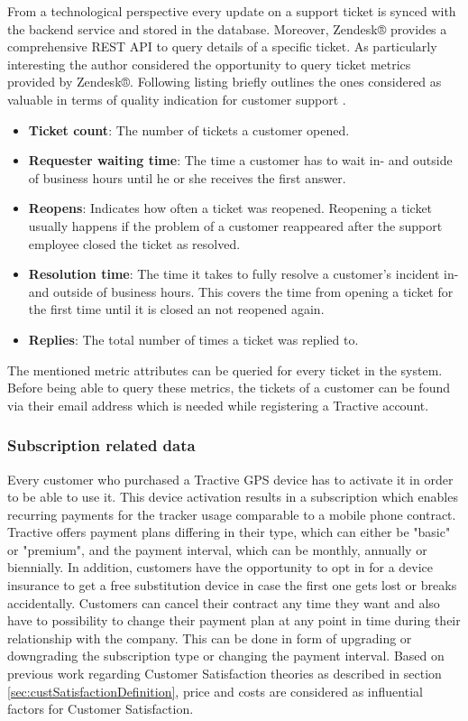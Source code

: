 From a technological perspective every update on a support ticket is synced with the backend service and stored in the database. Moreover, Zendesk® provides a comprehensive REST API to query details of a specific ticket. As particularly interesting the author considered the opportunity to query ticket metrics provided by Zendesk®. Following listing briefly outlines the ones considered as valuable in terms of quality indication for customer support \cite{zendeskWeb}.

\begin{itemize}
	\item \textbf{Ticket count}: The number of tickets a customer opened.
	\item \textbf{Requester waiting time}: The time a customer has to wait in- and outside of business hours until he or she receives the first answer.
	\item \textbf{Reopens}: Indicates how often a ticket was reopened. Reopening a ticket usually happens if the problem of a customer reappeared after the support employee closed the ticket as resolved.
	\item \textbf{Resolution time}: The time it takes to fully resolve a customer's incident in- and outside of business hours. This covers the time from opening a ticket for the first time until it is closed an not reopened again. 
	\item \textbf{Replies}: The total number of times a ticket was replied to.
\end{itemize}

The mentioned metric attributes can be queried for every ticket in the system. Before being able to query these metrics, the tickets of a customer can be found via their email address which is needed while registering a Tractive account. 

\subsubsection{Subscription related data}
Every customer who purchased a Tractive GPS device has to activate it in order to be able to use it. This device activation results in a subscription which enables recurring payments for the tracker usage comparable to a mobile phone contract. Tractive offers payment plans differing in their type, which can either be "basic" or "premium", and the payment interval, which can be monthly, annually or biennially. In addition, customers have the opportunity to opt in for a device insurance to get a free substitution device in case the first one gets lost or breaks accidentally. Customers can cancel their contract any time they want and also have to possibility to change their payment plan at any point in time during their relationship with the company. This can be done in form of upgrading or downgrading the subscription type or changing the payment interval. Based on previous work regarding Customer Satisfaction theories as described in section \ref{sec:custSatisfactionDefinition}, price and costs are considered as influential factors for Customer Satisfaction. 

